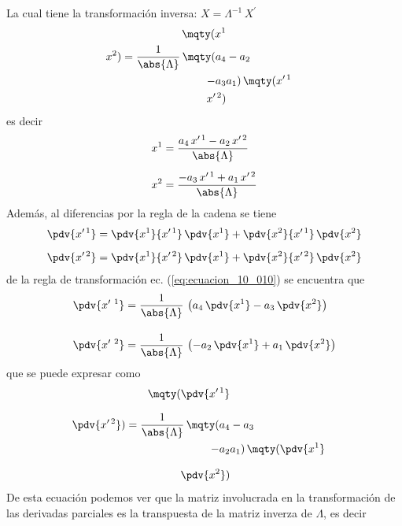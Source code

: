 La cual tiene la transformación inversa: $X = \Lambda^{-1} \, X^{\prime}$
\begin{align}
\mqty(x^{1} \\ x^{2}) = \dfrac{1}{\abs{\Lambda}} \, 
\mqty(a_{4} & - a_{2} \\ - a_{3} & a_{1}) \, \mqty(x^{\prime \, 1} \\ x^{\prime \, 2})
\label{eq:ecuacion_10_008}   
\end{align}
es decir
\begin{align}
x^{1} &= \dfrac{a_{4} \, x^{\prime \, 1} - a_{2} \, x^{\prime \, 2}}{\abs{\Lambda}} \label{eq:ecuacion_10_009} \\[0.5em]
x^{2} &= \dfrac{-a_{3} \, x^{\prime \, 1} + a_{1} \, x^{\prime \, 2}}{\abs{\Lambda}} \label{eq:ecuacion_10_010}
\end{align}
Además, al diferencias por la regla de la cadena se tiene
\begin{align}
\begin{aligned}
\pdv{x^{\prime \, 1}} &= \pdv{x^{1}}{x^{\prime \, 1}} \, \pdv{x^{1}} + \pdv{x^{2}}{x^{\prime \, 1}} \, \pdv{x^{2}} \\[0.5em]
\pdv{x^{\prime \, 2}} &= \pdv{x^{1}}{x^{\prime \, 2}} \, \pdv{x^{1}} + \pdv{x^{2}}{x^{\prime \, 2}} \, \pdv{x^{2}}
\end{aligned}
\label{eq:ecuacion_10_011}
\end{align}
de la regla de transformación ec. (\ref{eq:ecuacion_10_010}) se encuentra que
\begin{align}
\begin{aligned}
\pdv{x^{\prime \ 1}} &= \dfrac{1}{\abs{\Lambda}} \, \left( a_{4} \, \pdv{x^{1}} - a_{3} \, \pdv{x^{2}} \right) \\[1em]
\pdv{x^{\prime \ 2}} &= \dfrac{1}{\abs{\Lambda}} \, \left( - a_{2} \, \pdv{x^{1}} + a_{1} \, \pdv{x^{2}} \right)
\end{aligned}
\label{eq:ecuacion_10_012}
\end{align}
que se puede expresar como
\begin{align}
\mqty(\displaystyle \pdv{x^{\prime \, 1}} \\[0.75em] \displaystyle \pdv{x^{\prime \, 2}}) = \dfrac{1}{\abs{\Lambda}} \, \mqty(a_{4} & - a_{3} \\ - a_{2} & a_{1}) \, \mqty(\displaystyle \pdv{x^{1}} \\[0.75em] \displaystyle \pdv{x^{2}})
\label{eq:ecuacion_10_013}   
\end{align}
De esta ecuación podemos ver que la matriz involucrada en la transformación de las derivadas parciales es la transpuesta de la matriz inverza de $\Lambda$, es decir

